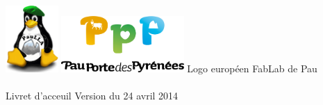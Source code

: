 \begin{center}
\includegraphics[width=0.15\textwidth]{paulla.png} \hfill
\includegraphics[width=0.35\textwidth]{PPP.png} \hfill
Logo européen
\vfill
\Huge FabLab de Pau\\~\\
\huge Livret d'acceuil
\vfill
\footnotesize Version du 24 avril 2014
\end{center}
